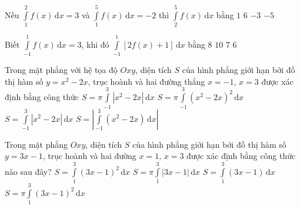 \begin{ex}%
	Nếu $\displaystyle\int \limits_1^2 f(x) \mathrm{\,d}x=3$ và $ \displaystyle\int \limits_1^5 f(x) \mathrm{\,d}x=-2$ thì $ \displaystyle\int \limits_2^5 f(x) \mathrm{\,d}x$ bằng
	\choice
	{$1$}
	{$6$}
	{$-3$}
	{\True $-5$}
\end{ex}

\begin{ex}%
Biết $\displaystyle\int\limits_{-1}^{1} f(x) \mathrm{\,d}x=3$, khi đó $\displaystyle\int\limits_{-1}^{1} \left[2f(x)+1\right]\mathrm{\,d}x$ bằng
	\choice
	{\True $8$}
	{$10$}
	{$7$}
	{$6$}
\end{ex}

\begin{ex}%
	Trong mặt phẳng với hệ tọa độ $Oxy$, diện tích $S$ của hình phẳng giới hạn bởi đồ thị hàm số $y=x^2-2x$, trục hoành và hai đường thẳng $x=-1$, $x=3$ được xác định bằng công thức
	\choice
	{$S=\pi\displaystyle\int\limits_{-1}^{3}\left|x^2-2x\right|\mathrm{\,d}x$}
	{$S=\pi\displaystyle\int\limits_{-1}^{3}\left(x^2-2x\right)^2\mathrm{\,d}x$}
	{\True $S=\displaystyle\int\limits_{-1}^{3}\left|x^2-2x\right|\mathrm{\,d}x$}
	{$S=\left|\displaystyle\int\limits_{-1}^{3}(x^2-2x)\mathrm{\,d}x\right|$}
\end{ex}

\begin{ex}%
	Trong mặt phẳng $Oxy$, diện tích $S$ của hình phẳng giới hạn bởi đồ thị hàm số $y=3x-1$, trục hoành và hai đường $x=1$, $x=3$ được xác định bằng công thức nào sau đây?
	\choice
	{$S=\displaystyle\int\limits_{1}^{3} (3x-1)^2 \,\mathrm{d}x$}
	{$S=\pi \displaystyle\int\limits_{1}^{3} \left| 3x-1 \right| \,\mathrm{d}x$}
	{\True $S=\displaystyle\int\limits_{1}^{3}(3x-1) \,\mathrm{d}x$}
	{$S=\pi \displaystyle\int\limits_{1}^{3} (3x-1 )^2 \,\mathrm{d}x$}
\end{ex}


